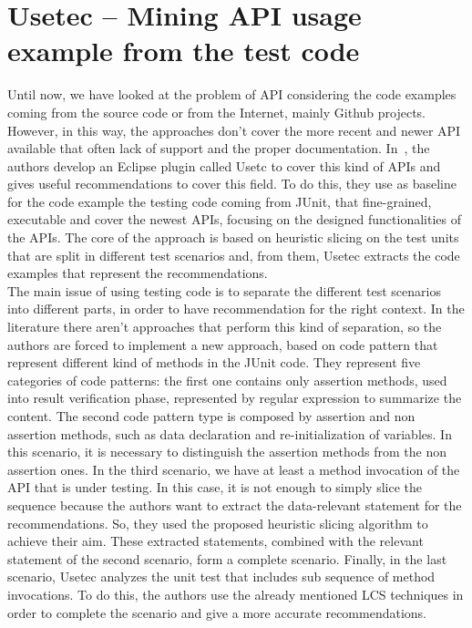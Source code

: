 \section{Usetec -- Mining API usage example from the test code}
Until now, we have looked at the problem of API considering the code examples coming from the source code or from the Internet, mainly Github projects. However, in this way, the approaches don't cover the more recent and newer API available that often lack of support and the proper documentation. In~\cite{zhu_mining_2014}, the authors develop an Eclipse plugin called Usetc to cover this kind of APIs and gives useful recommendations to cover this field. To do this, they use as baseline for the code example the testing code coming from JUnit, that fine-grained, executable and cover the newest APIs, focusing on the designed functionalities of the APIs. The core of the approach is based on heuristic slicing on the test units that are split in different test scenarios and, from them, Usetec extracts the code examples that represent the recommendations. \\
The main issue of using testing code is to separate the different test scenarios into different parts, in order to have recommendation for the right context. In the literature there aren't approaches that perform this kind of separation, so the authors are forced to implement a new approach, based on code pattern that represent different kind of methods in the JUnit code. They represent five categories of code patterns: the first one contains only assertion methods, used into result verification phase, represented by regular expression to summarize the content. The second code pattern type is composed by assertion and non assertion methods, such as data declaration and re-initialization of variables. In this scenario, it is necessary to distinguish the assertion methods from the non assertion ones. In the third scenario, we have at least a method invocation of the API that is under testing. In this case, it is not enough to simply slice the sequence because the authors want to extract the data-relevant statement for the recommendations. So, they used the proposed heuristic slicing algorithm to achieve their aim. These extracted statements, combined with the relevant statement of the second scenario, form a complete scenario. Finally, in the last scenario, Usetec analyzes the unit test that includes sub sequence of method invocations. To do this, the authors use the already mentioned LCS techniques in order to complete the scenario and give a more accurate recommendations. \newline
